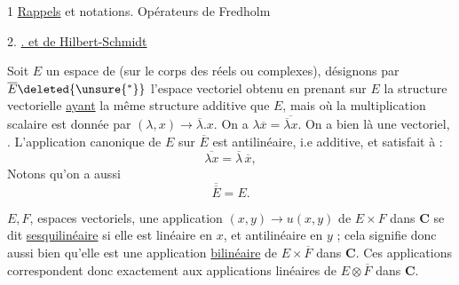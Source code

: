 1 \uline{Rappels}  et notations. Opérateurs de Fredholm

2. \uline{.  et de Hilbert-Schmidt}

Soit $E$ un espace de  (sur le corps des réels ou complexes), désignons par $\overline E\deleted{\unsure{{}^*}}$ l'espace  vectoriel obtenu en prenant sur $E$ la structure vectorielle \uline{ayant} la même structure additive que $E$, mais où la multiplication scalaire est donnée par $(\lambda,x)\longrightarrow\overline\lambda.x$.
On a $\lambda\overline x=\overline{\overline\lambda x}$.
On a bien là une   vectoriel, .
L'application canonique  de $E$ sur $\overline E$ est antilinéaire, i.e  additive, et satisfait à :
\[
\overline{\lambda x}=\overline\lambda\,\overline x,
\]
Notons qu'on a aussi
\[
\overline{\overline E}=E.
\]


$E,F$,   espaces vectoriels, une application $(x,y)\longrightarrow u(x,y)$  de $E\times F$  dans $\mathbf C$ se dit \uline{sesquilinéaire} si elle est linéaire en $x$, et antilinéaire en $y$ ; cela signifie donc aussi bien qu'elle est une application \uline{bilinéaire} de $E\times\overline F$ dans $\mathbf C$. Ces applications correspondent donc exactement aux applications linéaires de $E\otimes\overline F$ dans $\mathbf C$.


